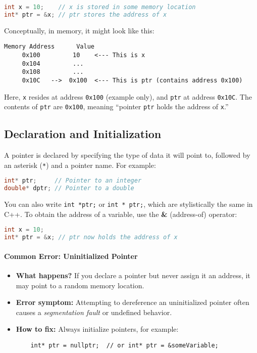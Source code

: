 \documentclass[a4paper,12pt]{article}
\begin{document}
\begin{lstlisting}[language=C++]
int x = 10;    // x is stored in some memory location
int* ptr = &x; // ptr stores the address of x
\end{lstlisting}

Conceptually, in memory, it might look like this:

\begin{verbatim}
Memory Address      Value
     0x100         10    <--- This is x
     0x104         ... 
     0x108         ...
     0x10C   -->  0x100  <--- This is ptr (contains address 0x100)
\end{verbatim}

Here, \texttt{x} resides at address \texttt{0x100} (example only), and \texttt{ptr} at address \texttt{0x10C}. The contents of \texttt{ptr} are \texttt{0x100}, meaning ``pointer \texttt{ptr} holds the address of \texttt{x}.''

\subsection{Declaration and Initialization}

A pointer is declared by specifying the type of data it will point to, followed by an asterisk (\texttt{*}) and a pointer name. For example:

\begin{lstlisting}[language=C++]
int* ptr;     // Pointer to an integer
double* dptr; // Pointer to a double
\end{lstlisting}

You can also write \texttt{int *ptr;} or \texttt{int * ptr;}, which are stylistically the same in C++. To obtain the address of a variable, use the \textbf{\&} (address-of) operator:

\begin{lstlisting}[language=C++]
int x = 10;
int* ptr = &x; // ptr now holds the address of x
\end{lstlisting}

\paragraph{Common Error: Uninitialized Pointer}
\begin{itemize}
    \item \textbf{What happens?} If you declare a pointer but never assign it an address, it may point to a random memory location.
    \item \textbf{Error symptom:} Attempting to dereference an uninitialized pointer often causes a \textit{segmentation fault} or undefined behavior.
    \item \textbf{How to fix:} Always initialize pointers, for example:
    \begin{lstlisting}
    int* ptr = nullptr;  // or int* ptr = &someVariable;
    \end{lstlisting}
\end{itemize}
\end{document}
